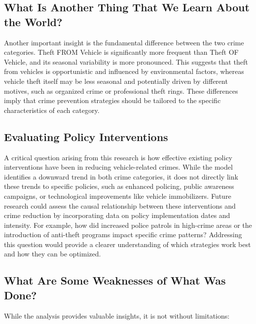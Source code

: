 \documentclass[
  letterpaper,
  DIV=11,
  numbers=noendperiod]{scrartcl}
\begin{document}
\subsection{What Is Another Thing That We Learn About the
World?}\label{what-is-another-thing-that-we-learn-about-the-world}

Another important insight is the fundamental difference between the two
crime categories. Theft FROM Vehicle is significantly more frequent than
Theft OF Vehicle, and its seasonal variability is more pronounced. This
suggests that theft from vehicles is opportunistic and influenced by
environmental factors, whereas vehicle theft itself may be less seasonal
and potentially driven by different motives, such as organized crime or
professional theft rings. These differences imply that crime prevention
strategies should be tailored to the specific characteristics of each
category.

\subsection{Evaluating Policy
Interventions}\label{evaluating-policy-interventions}

A critical question arising from this research is how effective existing
policy interventions have been in reducing vehicle-related crimes. While
the model identifies a downward trend in both crime categories, it does
not directly link these trends to specific policies, such as enhanced
policing, public awareness campaigns, or technological improvements like
vehicle immobilizers. Future research could assess the causal
relationship between these interventions and crime reduction by
incorporating data on policy implementation dates and intensity. For
example, how did increased police patrols in high-crime areas or the
introduction of anti-theft programs impact specific crime patterns?
Addressing this question would provide a clearer understanding of which
strategies work best and how they can be optimized.

\subsection{What Are Some Weaknesses of What Was
Done?}\label{what-are-some-weaknesses-of-what-was-done}

While the analysis provides valuable insights, it is not without
limitations:
\end{document}
